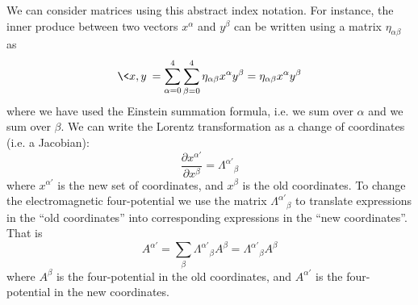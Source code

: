 We can consider matrices using this abstract index notation. For
instance, the inner produce between two vectors $x^{\alpha}$ and
$y^{\beta}$ can be written using a matrix $\eta_{\alpha\beta}$ as
\begin{equation}%
\<x,y\> = \sum_{\alpha=0}^{4}\sum_{\beta=0}^{4}
\eta_{\alpha\beta}x^{\alpha}y^{\beta} = \eta_{\alpha\beta}x^{\alpha}y^{\beta}
\end{equation}
where we have used the Einstein summation formula, i.e. we sum
over $\alpha$ and we sum over $\beta$. We can write the Lorentz
transformation as a change of coordinates (i.e. a Jacobian):
\begin{equation}%
\frac{\partial x^{\alpha'}}{\partial x^{\beta}} = {\Lambda^{\alpha'}}_{\beta}
\end{equation}
where $x^{\alpha'}$ is the new set of coordinates, and
$x^{\beta}$ is the old coordinates. To change the electromagnetic
four-potential we use the matrix ${\Lambda^{\alpha'}}_{\beta}$ to
translate expressions in the ``old coordinates'' into
corresponding expressions in the ``new coordinates''. That is
\begin{equation}%
A^{\alpha'} = \sum_{\beta} {\Lambda^{\alpha'}}_{\beta}A^{\beta} = {\Lambda^{\alpha'}}_{\beta}A^{\beta}
\end{equation}
where $A^{\beta}$ is the four-potential in the old coordinates,
and $A^{\alpha'}$ is the four-potential in the new coordinates.

